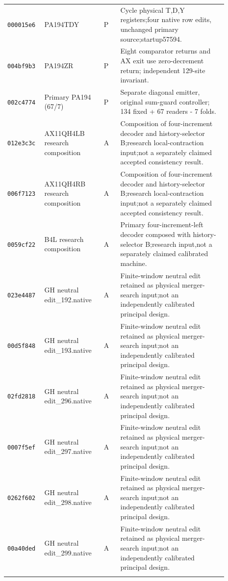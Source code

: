 \begin{longtable}{p{0.12\linewidth}p{0.25\linewidth}p{0.07\linewidth}p{0.45\linewidth}}
\texttt{000015e6} & PA194TDY & P & Cycle physical T,D,Y registers;four native row edits, unchanged primary source;startup57594. \\ \addlinespace[2pt]
\texttt{004bf9b3} & PA194ZR & P & Eight comparator returns and AX exit use zero-decrement return; independent 129-site invariant. \\ \addlinespace[2pt]
\texttt{002c4774} & Primary PA194 (67/7) & P & Separate diagonal emitter, original sum-guard controller; 134 fixed + 67 readers - 7 folds. \\ \addlinespace[2pt]
\texttt{012e3c3c} & AX11QH4LB research composition & A & Composition of four-increment decoder and history-selector B;research local-contraction input;not a separately claimed accepted consistency result. \\ \addlinespace[2pt]
\texttt{006f7123} & AX11QH4RB research composition & A & Composition of four-increment decoder and history-selector B;research local-contraction input;not a separately claimed accepted consistency result. \\ \addlinespace[2pt]
\texttt{0059cf22} & B4L research composition & A & Primary four-increment-left decoder composed with history-selector B;research input,not a separately claimed calibrated machine. \\ \addlinespace[2pt]
\texttt{023e4487} & GH neutral edit\_\allowbreak 192.native & A & Finite-window neutral edit retained as physical merger-search input;not an independently calibrated principal design. \\ \addlinespace[2pt]
\texttt{00d5f848} & GH neutral edit\_\allowbreak 193.native & A & Finite-window neutral edit retained as physical merger-search input;not an independently calibrated principal design. \\ \addlinespace[2pt]
\texttt{02fd2818} & GH neutral edit\_\allowbreak 296.native & A & Finite-window neutral edit retained as physical merger-search input;not an independently calibrated principal design. \\ \addlinespace[2pt]
\texttt{0007f5ef} & GH neutral edit\_\allowbreak 297.native & A & Finite-window neutral edit retained as physical merger-search input;not an independently calibrated principal design. \\ \addlinespace[2pt]
\texttt{0262f602} & GH neutral edit\_\allowbreak 298.native & A & Finite-window neutral edit retained as physical merger-search input;not an independently calibrated principal design. \\ \addlinespace[2pt]
\texttt{00a40ded} & GH neutral edit\_\allowbreak 299.native & A & Finite-window neutral edit retained as physical merger-search input;not an independently calibrated principal design. \\ \addlinespace[2pt]

\end{longtable}
